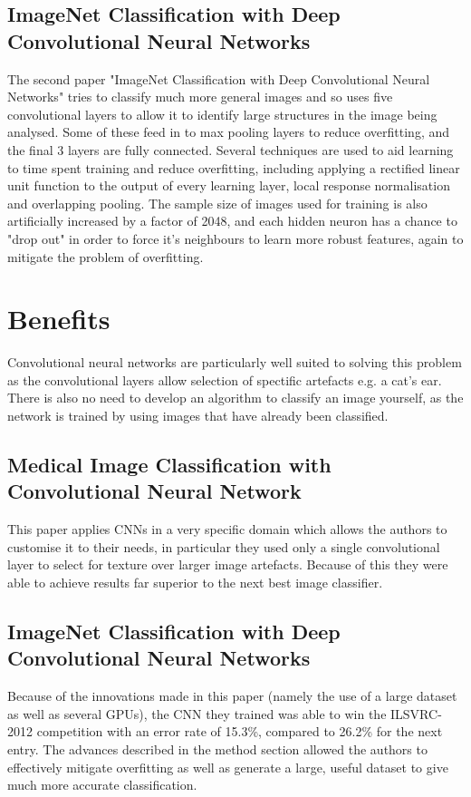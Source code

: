 \documentclass{article}
\begin{document}
\subsection{ImageNet Classification with Deep Convolutional Neural Networks}
The second paper "ImageNet Classification with Deep Convolutional Neural Networks" tries to classify much more general images and so uses five convolutional layers to allow it to identify large structures in the image being analysed\cite{imagenet}. Some of these feed in to max pooling layers to reduce overfitting, and the final 3 layers are fully connected. Several techniques are used to aid learning to time spent training and reduce overfitting, including applying a rectified linear unit function to the output of every learning layer, local response normalisation and overlapping pooling. The sample size of images used for training is also artificially increased by a factor of 2048, and each hidden neuron has a chance to "drop out" in order to force it's neighbours to learn more robust features, again to mitigate the problem of overfitting. 

\section{Benefits}
Convolutional neural networks are particularly well suited to solving this problem as the convolutional layers allow selection of spectific artefacts e.g. a cat's ear. There is also no need to develop an algorithm to classify an image yourself, as the network is trained by using images that have already been classified.

\subsection{Medical Image Classification with Convolutional Neural Network}
This paper applies CNNs in a very specific domain which allows the authors to customise it to their needs, in particular they used only a single convolutional layer to select for texture over larger image artefacts. Because of this they were able to achieve results far superior to the next best image classifier\cite{medical}.

\subsection{ImageNet Classification with Deep Convolutional Neural Networks}
Because of the innovations made in this paper (namely the use of a large dataset as well as several GPUs), the CNN they trained was able to win the ILSVRC-2012 competition with an error rate of 15.3\%, compared to 26.2\% for the next entry\cite{imagenet}. The advances described in the method section allowed the authors to effectively mitigate overfitting as well as generate a large, useful dataset to give much more accurate classification.
\end{document}
